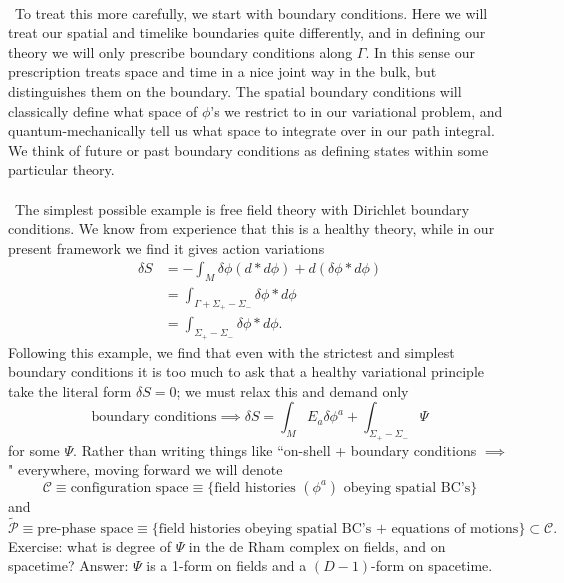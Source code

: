 \documentclass[11pt,letterpaper]{article}
\newcommand{\mc}[1]{\mathcal{#1}}
\begin{document}
\\
\
To treat this more carefully, we start with boundary conditions. Here we will treat our spatial and timelike boundaries quite differently, and in defining our theory we will only prescribe boundary conditions along $\Gamma$. In this sense our prescription treats space and time in a nice joint way in the bulk, but distinguishes them on the boundary. The spatial boundary conditions will classically define what space of $\phi$'s we restrict to in our variational problem, and quantum-mechanically tell us what space to integrate over in our path integral. We think of future or past boundary conditions as defining states within some particular theory.\\
\\
\
The simplest possible example is free field theory with Dirichlet boundary conditions. We know from experience that this is a healthy theory, while in our present framework we find it gives action variations \begin{equation}
\begin{aligned}
\delta S & = - \int_M \delta \phi (d * d \phi) + d (\delta \phi  * d \phi) \\
& = \int_{\Gamma + \Sigma_+ - \Sigma_- } \delta \phi * d \phi \\
& = \int_{\Sigma_+ - \Sigma_- } \delta \phi * d \phi.
\end{aligned}
\end{equation}
Following this example, we find that even with the strictest and simplest boundary conditions it is too much to ask that a healthy variational principle take the literal form $\delta S = 0$; we must relax this and demand only \begin{equation}
\mbox{boundary conditions} \implies \delta S = \int_M E_a \delta \phi^a + \int_{\Sigma_+ - \Sigma_-} \Psi
\end{equation}
for some $\Psi$. Rather than writing things like ``on-shell + boundary conditions $\implies$" everywhere, moving forward we will denote \begin{equation}
\mc{C} \equiv \mbox{configuration space} \equiv \{ \mbox{field histories }  (\phi^a) \mbox{ obeying spatial BC's}\}
\end{equation}
and \begin{equation}
\tilde{\mc{P}} \equiv \mbox{pre-phase space} \equiv \{\mbox{field histories obeying spatial BC's + equations of motions}\} \subset \mc{C}.
\end{equation}
Exercise: what is degree of $\Psi$ in the de Rham complex on fields, and on spacetime? Answer: $\Psi$ is a 1-form on fields and a $(D-1)$-form on spacetime.\\
\end{document}

